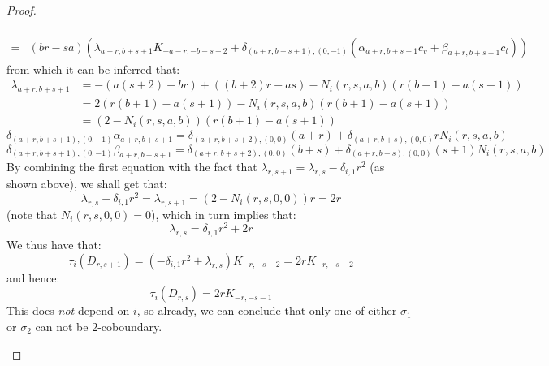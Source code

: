 \begin{proof}
\begin{enumerate}
$$\begin{aligned}
                                \\
                                = & (br - sa) \left( \lambda_{a + r, b + s + 1} K_{-a - r, -b - s - 2} + \delta_{(a + r, b + s + 1), (0, -1)}( \alpha_{a + r, b + s + 1} c_v + \beta_{a + r, b + s + 1} c_t ) \right)
                            \end{aligned}
                        $$
                    from which it can be inferred that:
                        $$
                            \begin{aligned}
                                \lambda_{a + r, b + s + 1} & = -\left( a(s + 2) - br \right) + \left( (b + 2) r - as \right) - N_i(r, s, a, b)( r(b + 1) - a(s + 1) )
                                \\
                                & = 2( r(b + 1) - a(s + 1) ) - N_i(r, s, a, b)( r(b + 1) - a(s + 1) )
                                \\
                                & = ( 2 - N_i(r, s, a, b) ) ( r(b + 1) - a(s + 1) )
                            \end{aligned}
                        $$
                        $$\delta_{(a + r, b + s + 1), (0, -1)} \alpha_{a + r, b + s + 1} = \delta_{(a + r, b + s + 2), (0, 0)} (a + r) + \delta_{(a + r, b + s), (0, 0)} r N_i(r, s, a, b)$$
                        $$\delta_{(a + r, b + s + 1), (0, -1)} \beta_{a + r, b + s + 1} = \delta_{(a + r, b + s + 2), (0, 0)} (b + s) + \delta_{(a + r, b + s), (0, 0)} (s + 1) N_i(r, s, a, b)$$
                    By combining the first equation with the fact that $\lambda_{r, s + 1} = \lambda_{r, s} - \delta_{i, 1} r^2$ (as shown above), we shall get that:
                        $$\lambda_{r, s} - \delta_{i, 1} r^2 = \lambda_{r, s + 1} = (2 - N_i(r, s, 0, 0)) r = 2r$$
                    (note that $N_i(r, s, 0, 0) = 0$), which in turn implies that:
                        $$\lambda_{r, s} = \delta_{i, 1} r^2 + 2r$$
                    We thus have that:
                        $$\tau_i(D_{r, s + 1}) = (-\delta_{i, 1} r^2 + \lambda_{r, s}) K_{-r, -s - 2} = 2r K_{-r, -s - 2}$$
                    and hence:
                        $$\tau_i(D_{r, s}) = 2r K_{-r, -s - 1}$$
                    This does \textit{not} depend on $i$, so already, we can conclude that only one of either $\sigma_1$ or $\sigma_2$ can not be $2$-coboundary.


\end{enumerate}
\end{proof}
